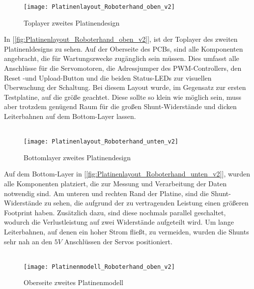 \documentclass[titlepage,12pt,twoside]{article}
\begin{document}
\begin{figure}[H]
	\begin{center}
		\scalebox{0.8}
		{\texttt{[image: Platinenlayout\_Roboterhand\_oben\_v2]}}
		\caption{Toplayer zweites Platinendesign}
		\label{fig:Platinenlayout_Roboterhand_oben_v2}	
	\end{center}
\end{figure}
\hfill \break
In [\textcolor{blue}{\autoref{fig:Platinenlayout_Roboterhand_oben_v2}}], ist der Toplayer des zweiten Platinenldesigns zu sehen. Auf der Oberseite des
PCBs, sind alle Komponenten angebracht, die für Wartungszwecke zugänglich sein müssen. Dies umfasst alle Anschlüsse für die Servomotoren,
die Adressjumper des PWM-Controllers, den Reset -und Upload-Button und die beiden Status-LEDs zur visuellen Überwachung der Schaltung. 
Bei diesem Layout wurde, im Gegensatz zur ersten Testplatine, auf die größe geachtet. Diese sollte so klein wie möglich sein, muss
aber trotzdem genügend Raum für die großen Shunt-Widerstände und dicken Leiterbahnen auf dem Bottom-Layer lassen. \\
\\
\begin{figure}[H]
	\begin{center}
		\scalebox{0.6}
		{\texttt{[image: Platinenlayout\_Roboterhand\_unten\_v2]}}
		\caption{Bottomlayer zweites Platinendesign}
		\label{fig:Platinenlayout_Roboterhand_unten_v2}		
	\end{center}
\end{figure}
\hfill \break
Auf dem Bottom-Layer in [\textcolor{blue}{\autoref{fig:Platinenlayout_Roboterhand_unten_v2}}], wurden alle Komponenten platziert, die zur Messung und Verarbeitung
der Daten notwendig sind. Am unteren und rechten Rand der Platine, sind die Shunt-Widerstände zu sehen, die aufgrund der zu vertragenden
Leistung einen größeren Footprint haben. Zusätzlich dazu, sind diese nochmals parallel geschaltet, wodurch die Verlustleistung auf 
zwei Widerstände aufgeteilt wird. Um lange Leiterbahnen, auf denen ein hoher Strom fließt, zu vermeiden, wurden die Shunts sehr nah 
an den $5V$ Anschlüssen der Servos positioniert. \\
\\
\begin{figure}[H]
	\begin{center}
		\scalebox{0.8}
		{\texttt{[image: Platinenmodell\_Roboterhand\_oben\_v2]}}
		\caption{Oberseite zweites Platinenmodell}
		\label{fig:Platinenmodell_Roboterhand_oben_v2}		
	\end{center}
\end{figure}
\end{document}
